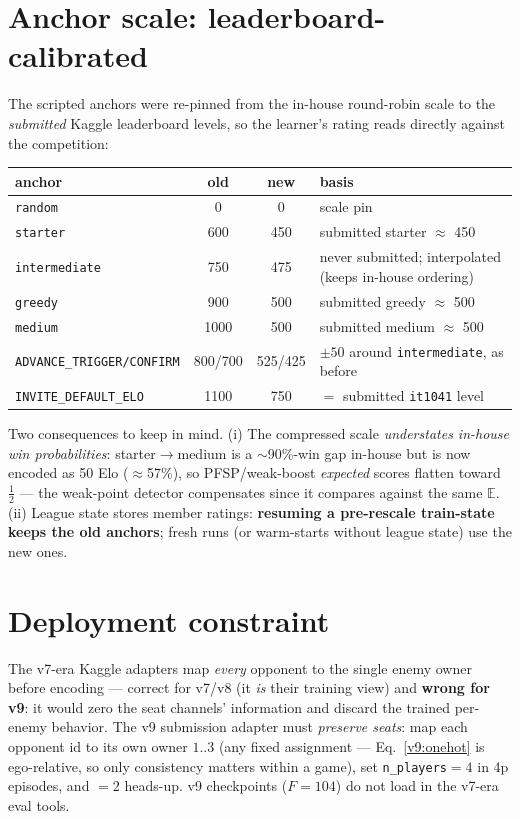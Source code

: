 \documentclass[11pt]{article}
\newcommand{\E}{\mathbb{E}}
\newcommand{\cd}[1]{\texttt{#1}}
\begin{document}
\section{Anchor scale: leaderboard-calibrated}\label{v9:anchors}
The scripted anchors were re-pinned from the in-house round-robin scale to the \emph{submitted}
Kaggle leaderboard levels, so the learner's rating reads directly against the competition:
\begin{center}\small
\begin{tabular}{@{}lccl@{}}
\toprule
anchor & old & new & basis \\
\midrule
\cd{random}        & 0    & 0   & scale pin \\
\cd{starter}       & 600  & 450 & submitted starter $\approx$ 450 \\
\cd{intermediate}  & 750  & 475 & never submitted; interpolated (keeps in-house ordering) \\
\cd{greedy}        & 900  & 500 & submitted greedy $\approx$ 500 \\
\cd{medium}        & 1000 & 500 & submitted medium $\approx$ 500 \\
\midrule
\cd{ADVANCE\_TRIGGER/CONFIRM} & 800/700 & 525/425 & $\pm50$ around \cd{intermediate}, as before \\
\cd{INVITE\_DEFAULT\_ELO}     & 1100    & 750     & $=$ submitted \cd{it1041} level \\
\bottomrule
\end{tabular}
\end{center}
Two consequences to keep in mind. (i) The compressed scale \emph{understates in-house win
probabilities}: starter$\to$medium is a $\sim$90\%-win gap in-house but is now encoded as 50 Elo
($\approx$57\%), so PFSP/weak-boost \emph{expected} scores flatten toward $\tfrac12$ --- the
weak-point detector compensates since it compares against the same $\E$. (ii) League state stores
member ratings: \textbf{resuming a pre-rescale train-state keeps the old anchors}; fresh runs (or
warm-starts without league state) use the new ones.

\section{Deployment constraint}\label{v9:deploy}
The v7-era Kaggle adapters map \emph{every} opponent to the single enemy owner before encoding ---
correct for v7/v8 (it \emph{is} their training view) and \textbf{wrong for v9}: it would zero the
seat channels' information and discard the trained per-enemy behavior. The v9 submission adapter
must \emph{preserve seats}: map each opponent id to its own owner $1..3$ (any fixed assignment ---
Eq.~\eqref{v9:onehot} is ego-relative, so only consistency matters within a game), set
\cd{n\_players}$=4$ in 4p episodes, and $=2$ heads-up. v9 checkpoints ($F{=}104$) do not load in
the v7-era eval tools.
\end{document}
